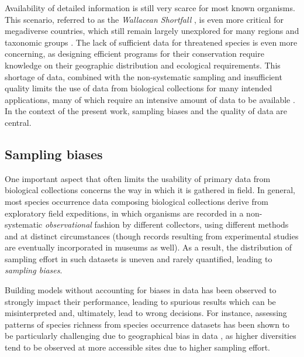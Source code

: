 
Availability of detailed information is still very scarce for most known organisms.
This scenario, referred to as the \textit{Wallacean Shortfall} \cite{Lomolino2004}, is even more critical for megadiverse countries, which still remain largely unexplored for many regions and taxonomic groups \cite{Soberon2004}.
The lack of sufficient data for threatened species is even more concerning, as designing efficient programs for their conservation require knowledge on their geographic distribution and ecological requirements.
This shortage of data, combined with the non-systematic sampling and insufficient quality limits the use of data from biological collections for many intended applications, many of which require an intensive amount of data to be available \cite{Guisan2007}.
In the context of the present work, sampling biases and the quality of data are central.


\subsection{Sampling biases}
One important aspect that often limits the usability of primary data from biological collections concerns the way in which it is gathered in field.
In general, most species occurrence data composing biological collections derive from exploratory field expeditions, in which organisms are recorded in a non-systematic \textit{observational} fashion by different collectors, using different methods and at distinct circumstances (though records resulting from experimental studies are eventually incorporated in museums as well). 
As a result, the distribution of sampling effort in such datasets is uneven and rarely quantified, leading to \textit{sampling biases}.

Building models without accounting for biases in data has been observed to strongly impact their performance, leading to spurious results which can be misinterpreted and, ultimately, lead to wrong decisions.
For instance, assessing patterns of species richness from species occurrence datasets has been shown to be particularly challenging due to geographical bias in data \cite{Hortal2007,Reddy2003}, as higher diversities tend to be observed at more accessible sites due to higher sampling effort.

